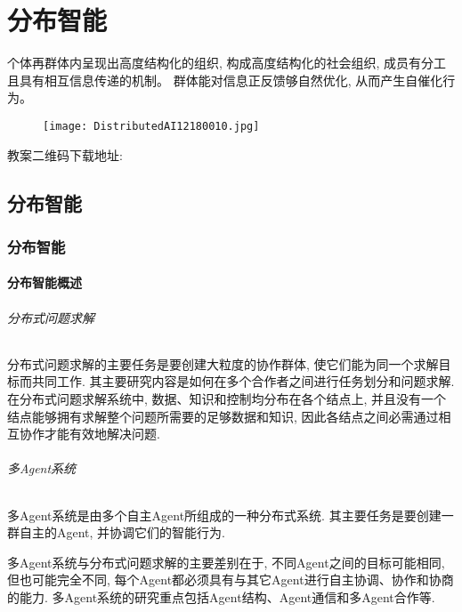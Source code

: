 
\chapter{分布智能}\label{SSPChapter9}
\begin{tcolorbox}[colback=white!50,colframe=orange!50,title=分布智能]
\begin{center}
个体再群体内呈现出高度结构化的组织, 构成高度结构化的社会组织, 成员有分工且具有相互信息传递的机制。
群体能对信息正反馈够自然优化, 从而产生自催化行为。
\hfill
\end{center}
\end{tcolorbox}
\begin{figure}[H]
\centering
\texttt{[image: DistributedAI12180010.jpg]}
\end{figure}
教案二维码下载地址: 
\section{分布智能}
\subsection{分布智能}
\subsubsection{分布智能概述}
\subparagraph{分布式问题求解}

分布式问题求解的主要任务是要创建大粒度的协作群体, 使它们能为同一个求解目标而共同工作. 其主要研究内容是如何在多个合作者之间进行任务划分和问题求解. 在分布式问题求解系统中, 数据、知识和控制均分布在各个结点上, 并且没有一个结点能够拥有求解整个问题所需要的足够数据和知识, 因此各结点之间必需通过相互协作才能有效地解决问题.
\subparagraph{多Agent系统}
多Agent系统是由多个自主Agent所组成的一种分布式系统. 其主要任务是要创建一群自主的Agent, 并协调它们的智能行为.

多Agent系统与分布式问题求解的主要差别在于, 不同Agent之间的目标可能相同, 但也可能完全不同, 每个Agent都必须具有与其它Agent进行自主协调、协作和协商的能力. 多Agent系统的研究重点包括Agent结构、Agent通信和多Agent合作等.
